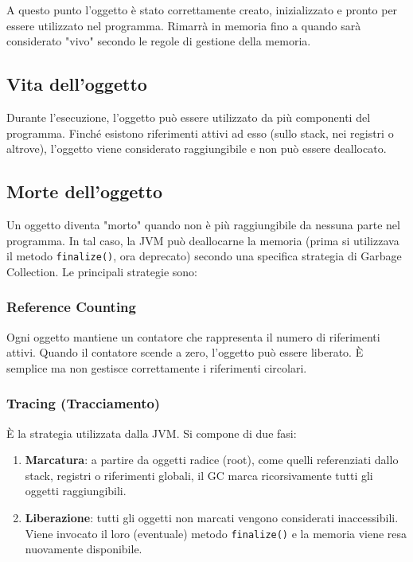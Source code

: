 \begin{solution}
A questo punto l’oggetto è stato correttamente creato, inizializzato e pronto per essere utilizzato nel programma. 
Rimarrà in memoria fino a quando sarà considerato "vivo" secondo le regole di gestione della memoria.

\subsection*{Vita dell'oggetto}
Durante l'esecuzione, l’oggetto può essere utilizzato da più componenti del programma. Finché esistono riferimenti attivi 
ad esso (sullo stack, nei registri o altrove), l'oggetto viene considerato raggiungibile e non può essere deallocato.

\subsection*{Morte dell’oggetto}
Un oggetto diventa "morto" quando non è più raggiungibile da nessuna parte nel programma. In tal caso, la JVM può deallocarne 
la memoria (prima si utilizzava il metodo \texttt{finalize()}, ora deprecato) secondo una specifica strategia di Garbage 
Collection. Le principali strategie sono:

\subsubsection*{Reference Counting}
Ogni oggetto mantiene un contatore che rappresenta il numero di riferimenti attivi. Quando il contatore scende a zero, 
l’oggetto può essere liberato. È semplice ma non gestisce correttamente i riferimenti circolari.

\subsubsection*{Tracing (Tracciamento)}
È la strategia utilizzata dalla JVM. Si compone di due fasi:

\begin{enumerate}
\item \textbf{Marcatura}: a partire da oggetti radice (root), come quelli referenziati dallo stack, registri o riferimenti globali, 
il GC marca ricorsivamente tutti gli oggetti raggiungibili.
\item \textbf{Liberazione}: tutti gli oggetti non marcati vengono considerati inaccessibili. Viene invocato il loro 
(eventuale) metodo \texttt{finalize()} e la memoria viene resa nuovamente disponibile.
\end{enumerate}
\end{solution}

